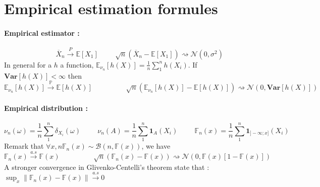 \documentclass[a4paper,10pt]{article}
\begin{document}
\section{Empirical estimation formules}
\paragraph{Empirical estimator : }
\[
\hspace{1cm} \overline{X}_n\xrightarrow{P} \mathbb{E}[X_{1}] \hspace{1cm} \sqrt{n}(\overline{X}_n -\mathbb{E}[X_{1}]) \rightsquigarrow   \mathcal{N}(0,\sigma^2) 
\]
In general for a $h$ a function, $\mathbb{E}_{\nu_n}[h(X)] = \frac{1}{n}\sum^n_1 h(X_i) $. If $\textbf{Var}[h(X)]<\infty$ then 
\[
\mathbb{E}_{\nu_n}[h(X)] \xrightarrow{ \mathbb{P} } \mathbb{E}[h(X)]
\hspace{2cm}
\sqrt{n}(\mathbb{E}_{\nu_n}[h(X)]  -   \mathbb{E}[h(X)]) \rightsquigarrow   \mathcal{N}(0, \textbf{Var}[h(X)] )
\]


\paragraph{Empirical distribution : }
\[
\nu_n(\omega) = \frac{1}{n}\sum^{n}_{1} \delta_{X_i}(\omega) 
\hspace{1cm} 
\nu_n(A) = \frac{1}{n} \sum^{n}_{1} \mathbf{1}_A(X_i)
\hspace{1cm} 
\mathbb{F}_n(x) = \frac{1}{n} \sum^{n}_{1} \mathbf{1}_{]-\infty;x]}(X_i) 
\]
Remark that $\forall x, n\mathbb{F}_n(x) \sim \mathcal{B}(n,\mathbb{F}(x) )$, we have
\[
\mathbb{F}_n(x) \xrightarrow{a.s}   \mathbb{F}(x)
\hspace{2cm} 
\sqrt{n}(\mathbb{F}_n(x) -  \mathbb{F}(x)) \rightsquigarrow   \mathcal{N}(0,\mathbb{F}(x)[1-\mathbb{F}(x)] )
\]
A stronger convergence in Glivenko-Centelli's theorem state that : $\sup_{x} \| \mathbb{F}_n(x) -  \mathbb{F}(x) \| \xrightarrow{a.s} 0$
\end{document}
